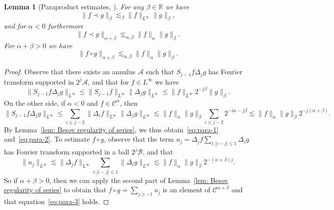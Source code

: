 \documentclass[11pt,a4paper]{article}
\newtheorem{lemma}[theorem]{Lemma}
\theoremstyle{remark}
\newcommand{\CA}{\ensuremath{\mathscr{A}}}
\newcommand{\CB}{\ensuremath{\mathscr{B}}}
\newcommand{\CC}{\ensuremath{\mathscr{C}}}
\begin{document}
\begin{lemma}[Paraproduct estimates, \cite{Bony1981}]\label{thm:paraproduct}
   For any $\beta \in \mathbb{R}$ we have
   \begin{equation} \label{eq:para-1}
       \| f \prec g \|_{\beta} \lesssim_{\beta} \| f \|_{L^{\infty}} \| g \|_{\beta} ,
   \end{equation}
   and for $\alpha <0$ furthermore
   \begin{equation}\label{eq:para-2}
      \| f \prec g \|_{\alpha + \beta} \lesssim_{\alpha , \beta} \| f \|_{\alpha} \| g \|_{\beta}.
   \end{equation}
   For $\alpha + \beta >0$ we have
   \begin{equation}\label{eq:para-3}
      \| f \circ g \|_{\alpha + \beta} \lesssim_{\alpha , \beta} \| f \|_{\alpha} \| g \|_{\beta}.
    \end{equation}
\end{lemma}

\begin{proof}
  Observe that there exists an annulus $\CA$ such that $S_{j-1} f \Delta_{j} g$ has Fourier transform supported in $2^{j} \CA$, and that for $f \in L^{\infty}$ we have
  \[
     \| S_{j-1} f \Delta_{j} g \|_{L^{\infty}} \leqslant \| S_{j-1} f  \|_{L^{\infty}} \| \Delta_{j} g \|_{L^{\infty}} \leqslant \| f \|_{L^{\infty}} 2^{-j \beta} \| g \|_{\beta}.
  \]
  On the other side, if $\alpha <0$ and $f \in \CC^{\alpha}$, then
  \[
     \| S_{j-1} f \Delta_{j} g \|_{L^{\infty}} \leqslant \sum_{i \leqslant j-2} \| \Delta_{i} f \|_{L^{\infty}} \| \Delta_{j} g \|_{L^{\infty}} \lesssim \| f \|_{\alpha} \| g \|_{\beta} \sum_{i \leqslant j-2} 2^{-i\alpha -j \beta} \lesssim \| f \|_{\alpha} \| g \|_{\beta} 2^{-j ( \alpha + \beta )} .
  \]
  By Lemma~\ref{lem: Besov regularity of series}, we thus obtain~{\eqref{eq:para-1}} and~{\eqref{eq:para-2}}. To estimate $f \circ g$, observe that the term $u_{j} = \Delta_{j} f \sum_{i: | i-j | \leqslant 1} \Delta_{i} g$ has Fourier transform supported in a ball $2^{j} \CB$, and that
  \[
     \| u_{j} \|_{L^{\infty}} \lesssim \| \Delta_{j} f \|_{L^{\infty}} \sum_{i: | i-j | \leqslant 1} \| \Delta_{i} g \|_{L^{\infty}} \lesssim \| f \|_{\alpha} \| g \|_{\beta} 2^{- ( \alpha + \beta ) j}.
  \]
  So if $\alpha + \beta >0$, then we can apply the second part of Lemma~\ref{lem: Besov regularity of series} to obtain that $f \circ g= \sum_{j \geqslant -1} u_{j}$ is an element of $\CC^{\alpha + \beta}$ and that equation~{\eqref{eq:para-3}} holds.
\end{proof}
\end{document}
